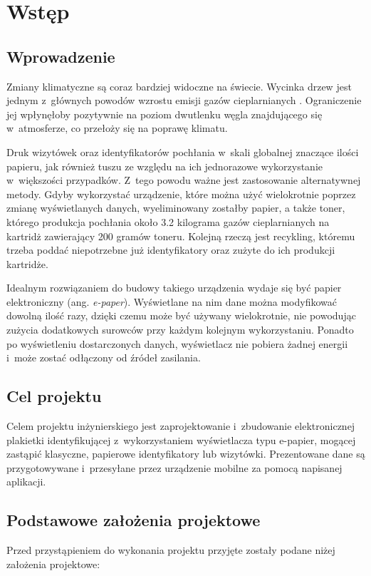 \documentclass[a4paper,12pt, twoside]{article}
\begin{document}
    	\section{Wstęp}
    	
    	\subsection{Wprowadzenie}
    	Zmiany klimatyczne są coraz bardziej widoczne na świecie. Wycinka drzew jest jednym z~głównych powodów wzrostu emisji gazów cieplarnianych \cite{clima_causes}. Ograniczenie jej wpłynęłoby pozytywnie na poziom dwutlenku węgla znajdującego się w~atmosferze, co przełoży się na poprawę klimatu. 
    	
    	Druk wizytówek oraz identyfikatorów pochłania w~skali globalnej znaczące ilości papieru, jak również tuszu ze względu na ich jednorazowe wykorzystanie w~większości przypadków. Z~tego powodu ważne jest zastosowanie alternatywnej metody. Gdyby wykorzystać urządzenie, które można użyć wielokrotnie poprzez zmianę wyświetlanych danych, wyeliminowany zostałby papier, a także toner, którego produkcja pochłania około 3.2 kilograma gazów cieplarnianych \cite{cartidge_production} na kartridż zawierający 200 gramów toneru. Kolejną rzeczą jest recykling, któremu trzeba poddać niepotrzebne już identyfikatory oraz zużyte do ich produkcji kartridże.
    	
    	Idealnym rozwiązaniem do budowy takiego urządzenia wydaje się być papier elektroniczny (ang. \textit{e-paper}). Wyświetlane na nim dane można modyfikować dowolną ilość razy, dzięki czemu może być używany wielokrotnie, nie powodując zużycia dodatkowych surowców przy każdym kolejnym wykorzystaniu. Ponadto po wyświetleniu dostarczonych danych, wyświetlacz nie pobiera żadnej energii i~może zostać odłączony od źródeł zasilania.

    	\subsection{Cel projektu}
    	Celem projektu inżynierskiego jest zaprojektowanie i~zbudowanie elektronicznej plakietki identyfikującej z~wykorzystaniem wyświetlacza typu e-papier, mogącej zastąpić klasyczne, papierowe identyfikatory lub wizytówki. Prezentowane dane są przygotowywane i~przesyłane przez urządzenie mobilne za pomocą napisanej aplikacji.

    	\subsection{Podstawowe założenia projektowe}
    	Przed przystąpieniem do wykonania projektu przyjęte zostały podane niżej założenia projektowe:
    	
\end{document}
